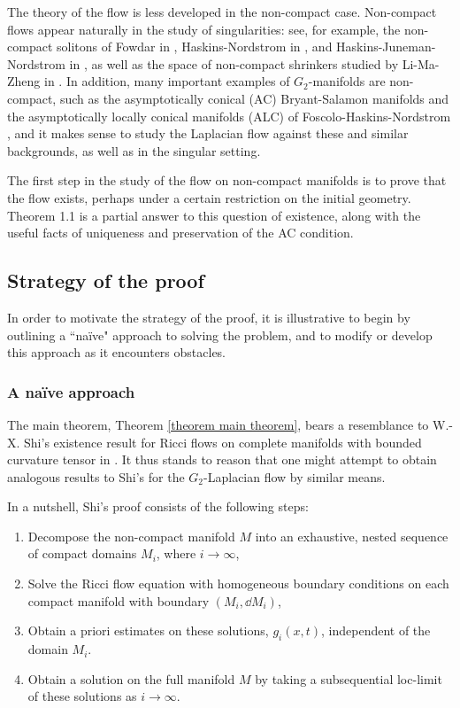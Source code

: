 \documentclass[hidelinks, 12pt, oneside, reqno]{amsart}
\begin{document}
The theory of the flow is less developed in the non-compact case. Non-compact flows appear naturally in the study of singularities: see, for example, the non-compact solitons of Fowdar in \cite{FowdarS1LaplacianFlow}, Haskins-Nordstrom in \cite{HaskinsNordstromLaplacianSolitons}, and Haskins-Juneman-Nordstrom in \cite{HaskinsJunemanNordstromExpanders}, as well as the space of non-compact shrinkers studied by Li-Ma-Zheng in \cite{LiMaZhengG2Solitons}. In addition, many important examples of $G_2$-manifolds are non-compact, such as the asymptotically conical (AC) Bryant-Salamon manifolds \cite{BryantSalamonExceptionalHolonomy} and the asymptotically locally conical manifolds (ALC) of Foscolo-Haskins-Nordstrom \cite{FoscoloHaskinsNordstromALC}, and it makes sense to study the Laplacian flow against these and similar backgrounds, as well as in the singular setting.

The first step in the study of the flow on non-compact manifolds is to prove that the flow exists, perhaps under a certain restriction on the initial geometry. Theorem 1.1 is a partial answer to this question of existence, along with the useful facts of uniqueness and preservation of the AC condition.

\subsection{Strategy of the proof}

In order to motivate the strategy of the proof, it is illustrative to begin by outlining a ``na\"ive" approach to solving the problem, and to modify or develop this approach as it encounters obstacles. 

\subsubsection{A na\"ive approach}

The main theorem, Theorem \ref{theorem main theorem}, bears a resemblance to W.-X. Shi's existence result for Ricci flows on complete manifolds with bounded curvature tensor in \cite{ShiDeforming}. It thus stands to reason that one might attempt to obtain analogous results to Shi's for the $G_2$-Laplacian flow by similar means. 

In a nutshell, Shi's proof consists of the following steps:
\begin{enumerate}
    \item Decompose the non-compact manifold $M$ into an exhaustive, nested sequence of compact domains $M_i$, where $i \rightarrow  \infty$,
    \item Solve the Ricci flow equation with homogeneous boundary conditions on each compact manifold with boundary $(M_i, \dd M_i)$,
    \item Obtain a priori estimates on these solutions, $g_i(x,t)$, independent of the domain $M_i$. 
    \item Obtain a solution on the full manifold $M$ by taking a subsequential loc-limit of these solutions as $i \rightarrow \infty$.
\end{enumerate}
\end{document}
